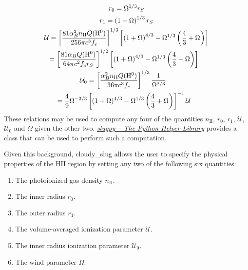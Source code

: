 \documentclass[letterpaper,10pt,english]{sphinxmanual}
\begin{document}
\begin{gather}
\begin{split}r_0 & = \Omega^{1/3} r_S \\\end{split}\notag\\\begin{split}r_1 & = \left(1 + \Omega\right)^{1/3} r_S \\\end{split}\notag\\\begin{split}\mathcal{U} & = \left[\frac{81 \alpha_B^2 n_{\mathrm{II}}
Q(\mathrm{H}^0)}{256 \pi c^3 f_e}\right]^{1/3}
\left[\left(1 + \Omega\right)^{4/3}
- \Omega^{1/3} \left(\frac{4}{3}+\Omega\right)\right] \\\end{split}\notag\\\begin{split}& = \left[\frac{81 \alpha_B Q(\mathrm{H}^0)}
{64 \pi c^2 f_e r_S}\right]^{1/2}
\left[\left(1 + \Omega\right)^{4/3}
- \Omega^{1/3} \left(\frac{4}{3}+\Omega\right)\right]\end{split}\notag\\\begin{split}\mathcal{U}_0 &= \left[
\frac{\alpha_B^2 n_{\mathrm{II}} Q(\mathrm{H}^0)}
{36 \pi c^3 f_e}\right]^{1/3} \frac{1}{\Omega^{2/3}}\end{split}\notag\\\begin{split}&= \frac{4}{9}\Omega^{-2/3} \left[(1+\Omega)^{4/3} -
\Omega^{1/3}\left(\frac{4}{3}+\Omega\right)\right]^{-1}
\mathcal{U}\end{split}\notag
\end{gather}
These relations may be used to compute any four of the quantities
\(n_{\mathrm{II}}\), \(r_0\), \(r_1\), \(\mathcal{U}\),
\(\mathcal{U}_0\) and \(\Omega\) given the other two.
{\hyperref[slugpy:sec\string-slugpy]{\emph{slugpy -- The Python Helper Library}}} provides a class  that can be used
to perform such a computation.

Given this background, cloudy\_slug allows the user to specify the
physical properties of the HII region by setting any two of the
following six quantities:
\begin{enumerate}
\item {} 
The photoionized gas density \(n_{\mathrm{II}}\).

\item {} 
The inner radius \(r_0\).

\item {} 
The outer radius \(r_1\).

\item {} 
The volume-averaged ionization parameter \(\mathcal{U}\).

\item {} 
The inner radius ionization parameter \(\mathcal{U}_0\).

\item {} 
The wind parameter \(\Omega\).

\end{enumerate}
\end{document}
